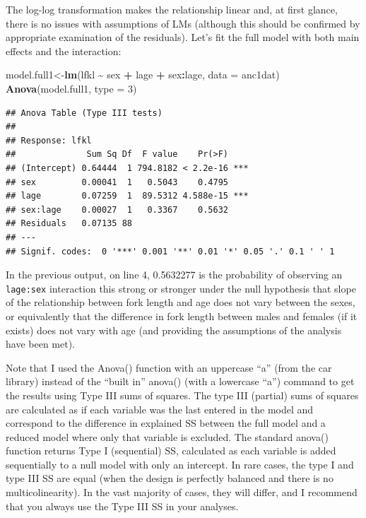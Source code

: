 \documentclass[
  12pt,
]{book}
\makeatletter
\newenvironment{Shaded}{\begin{snugshade}}{\end{snugshade}}
\newcommand{\DataTypeTok}[1]{\textcolor[rgb]{0.13,0.29,0.53}{#1}}
\newcommand{\DecValTok}[1]{\textcolor[rgb]{0.00,0.00,0.81}{#1}}
\newcommand{\KeywordTok}[1]{\textcolor[rgb]{0.13,0.29,0.53}{\textbf{#1}}}
\newcommand{\NormalTok}[1]{#1}
\newcommand{\OperatorTok}[1]{\textcolor[rgb]{0.81,0.36,0.00}{\textbf{#1}}}
\newcommand{\StringTok}[1]{\textcolor[rgb]{0.31,0.60,0.02}{#1}}
\newenvironment{kframe}{%
\medskip{}
\setlength{\fboxsep}{.8em}
\def\at@end@of@kframe{}%
\ifinner\ifhmode%
 \def\at@end@of@kframe{\end{minipage}}%
 \begin{minipage}{\columnwidth}%
\fi\fi%
\def\FrameCommand##1{\hskip\@totalleftmargin \hskip-\fboxsep
\colorbox{incolor}{##1}\hskip-\fboxsep
    \hskip-\linewidth \hskip-\@totalleftmargin \hskip\columnwidth}%
\MakeFramed {\advance\hsize-\width
  \@totalleftmargin\z@ \linewidth\hsize
  \@setminipage}}%
{\par\unskip\endMakeFramed%
\at@end@of@kframe}
\newenvironment{rmdblock}[1]
 {
 \begin{itemize}
 \renewcommand{\labelitemi}{
   \raisebox{-.7\height}[0pt][0pt]{
     {\setkeys{Gin}{width=3em,keepaspectratio}\texttt{[image: images/\#1]}}
   }
 }
 \begin{kframe}
 \setlength{\fboxsep}{1em}
 \item
 }
 {
 \end{kframe}
 \end{itemize}
 }
\newenvironment{rmdnote}
  {\begin{rmdblock}{note}}
  {\end{rmdblock}}
\makeatother
\begin{document}
The log-log transformation makes the relationship linear and, at first glance, there is no issues with assumptions of LMs (although this should be confirmed by appropriate examination of the residuals). Let's fit the full model with both main effects and the interaction:

\begin{Shaded}
\begin{Highlighting}[]
\NormalTok{model.full1\textless{}{-}}\KeywordTok{lm}\NormalTok{(lfkl }\OperatorTok{\textasciitilde{}}\StringTok{ }\NormalTok{sex }\OperatorTok{+}\StringTok{ }\NormalTok{lage }\OperatorTok{+}\StringTok{ }\NormalTok{sex}\OperatorTok{:}\NormalTok{lage, }\DataTypeTok{data =}\NormalTok{ anc1dat)}
\KeywordTok{Anova}\NormalTok{(model.full1, }\DataTypeTok{type =} \DecValTok{3}\NormalTok{)}
\end{Highlighting}
\end{Shaded}

\begin{verbatim}
## Anova Table (Type III tests)
## 
## Response: lfkl
##              Sum Sq Df  F value    Pr(>F)    
## (Intercept) 0.64444  1 794.8182 < 2.2e-16 ***
## sex         0.00041  1   0.5043    0.4795    
## lage        0.07259  1  89.5312 4.588e-15 ***
## sex:lage    0.00027  1   0.3367    0.5632    
## Residuals   0.07135 88                       
## ---
## Signif. codes:  0 '***' 0.001 '**' 0.01 '*' 0.05 '.' 0.1 ' ' 1
\end{verbatim}

In the previous output, on line 4, 0.5632277 is the probability of observing an \texttt{lage:sex} interaction this strong or stronger under the null hypothesis that slope of the relationship between fork length and age does not vary between the sexes, or equivalently that the difference in fork length between males and females (if it exists) does not vary with age (and providing the assumptions of the analysis have been met).

\begin{rmdnote}
Note that I used the Anova() function with an uppercase ``a'' (from the car library) instead of the ``built in'' anova() (with a lowercase ``a'') command to get the results using Type III sums of squares. The type III (partial) sums of squares are calculated as if each variable was the last entered in the model and correspond to the difference in explained SS between the full model and a reduced model where only that variable is excluded. The standard anova() function returns Type I (sequential) SS, calculated as each variable is added sequentially to a null model with only an intercept. In rare cases, the type I and type III SS are equal (when the design is perfectly balanced and there is no multicolinearity). In the vast majority of cases, they will differ, and I recommend that you always use the Type III SS in your analyses.
\end{rmdnote}
\end{document}
